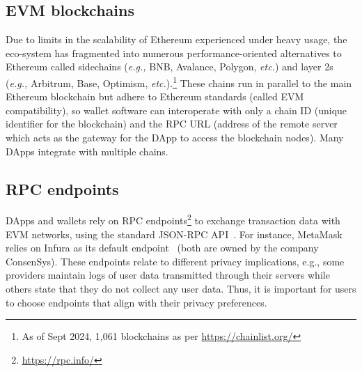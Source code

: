 \documentclass[conference]{IEEEtran}
\begin{document}
\subsection{\ac*{EVM} blockchains}
Due to limits in the scalability of Ethereum experienced under heavy usage, the eco-system has fragmented into numerous performance-oriented alternatives to Ethereum called sidechains (\textit{e.g.,} BNB, Avalance, Polygon, \textit{etc.}) and layer 2s (\textit{e.g.,} Arbitrum, Base, Optimism, \textit{etc.}).\footnote{As of Sept 2024, 1,061 blockchains as per \url{https://chainlist.org/}} These chains run in parallel to the main Ethereum blockchain but adhere to Ethereum standards (called EVM compatibility), so wallet software can interoperate with only a chain ID (unique identifier for the blockchain) and the \ac*{RPC} URL (address of the remote server which acts as the gateway for the DApp to access the blockchain nodes).
Many DApps integrate with multiple chains.



\subsection{RPC endpoints}
\label{sec:background:rpc}
DApps and wallets rely on RPC endpoints\footnote{\url{https://rpc.info/}} to exchange transaction data with \ac*{EVM} networks, using the standard JSON-RPC API~\cite{metamaskJsonRpcApi}.
For instance, MetaMask relies on Infura as its default endpoint~\cite{metamaskInfura} (both are owned by the company ConsenSys).
These endpoints relate to different privacy implications, e.g., some providers maintain logs of user data transmitted through their servers while others state that they do not collect any user data.
Thus, it is important for users to choose endpoints that align with their privacy preferences.
\end{document}
